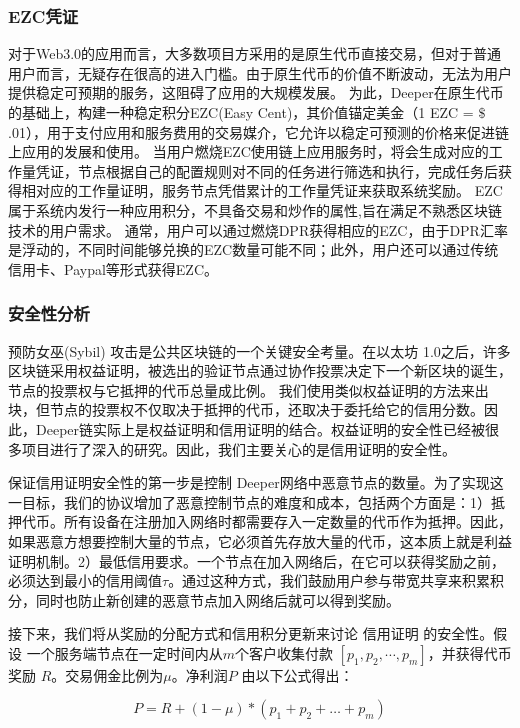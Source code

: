 \documentclass[a4paper]{article}
\begin{document}
\subsubsection{EZC凭证}
对于Web3.0的应用而言，大多数项目方采用的是原生代币直接交易，但对于普通用户而言，无疑存在很高的进入门槛。由于原生代币的价值不断波动，无法为用户提供稳定可预期的服务，这阻碍了应用的大规模发展。
为此，Deeper在原生代币的基础上，构建一种稳定积分EZC(Easy Cent)，其价值锚定美金（1 EZC = $\$$.01），用于支付应用和服务费用的交易媒介，它允许以稳定可预测的价格来促进链上应用的发展和使用。
当用户燃烧EZC使用链上应用服务时，将会生成对应的工作量凭证，节点根据自己的配置规则对不同的任务进行筛选和执行，完成任务后获得相对应的工作量证明，服务节点凭借累计的工作量凭证来获取系统奖励。
EZC属于系统内发行一种应用积分，不具备交易和炒作的属性,旨在满足不熟悉区块链技术的用户需求。
通常，用户可以通过燃烧DPR获得相应的EZC，由于DPR汇率是浮动的，不同时间能够兑换的EZC数量可能不同；此外，用户还可以通过传统信用卡、Paypal等形式获得EZC。

\subsubsection{安全性分析}
预防女巫(Sybil) 攻击是公共区块链的一个关键安全考量。在以太坊 1.0之后，许多区块链采用权益证明，被选出的验证节点通过协作投票决定下一个新区块的诞生，节点的投票权与它抵押的代币总量成比例。
我们使用类似权益证明的方法来出块，但节点的投票权不仅取决于抵押的代币，还取决于委托给它的信用分数。因此，Deeper链实际上是权益证明和信用证明的结合。权益证明的安全性已经被很多项目进行了深入的研究。因此，我们主要关心的是信用证明的安全性。

保证信用证明安全性的第一步是控制 Deeper网络中恶意节点的数量。为了实现这一目标，我们的协议增加了恶意控制节点的难度和成本，包括两个方面是：1）抵押代币。所有设备在注册加入网络时都需要存入一定数量的代币作为抵押。因此，如果恶意方想要控制大量的节点，它必须首先存放大量的代币，这本质上就是利益证明机制。2）最低信用要求。一个节点在加入网络后，在它可以获得奖励之前，必须达到最小的信用阈值$\tau$。通过这种方式，我们鼓励用户参与带宽共享来积累积分，同时也防止新创建的恶意节点加入网络后就可以得到奖励。

接下来，我们将从奖励的分配方式和信用积分更新来讨论 信用证明 的安全性。假设
一个服务端节点在一定时间内从$m$个客户收集付款 $[p_1, p_2,\cdots,p_m]$，并获得代币奖励 $R$。交易佣金比例为$\mu$。净利润$P$ 由以下公式得出：

\begin{equation}
    P = R + (1-\mu)*(p_1+p_2+\ldots+p_m)
\end{equation}
\end{document}
